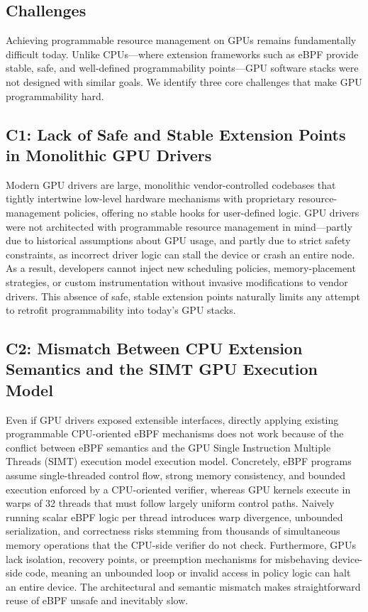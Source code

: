 \subsection{Challenges}
\label{sec:challenges}
Achieving programmable resource management on GPUs remains fundamentally difficult today. 
Unlike CPUs—where extension frameworks such as eBPF provide stable, safe, and well-defined programmability points—GPU software stacks were not designed with similar goals. 
We identify three core challenges that make GPU programmability hard.

\subsection{C1: Lack of Safe and Stable Extension Points in Monolithic GPU Drivers}
Modern GPU drivers are large, monolithic vendor-controlled codebases that tightly intertwine low-level hardware mechanisms with proprietary resource-management policies, offering no stable hooks for user-defined logic. 
GPU drivers were not architected with programmable resource management in mind—partly due to historical assumptions about GPU usage, and partly due to strict safety constraints, as incorrect driver logic can stall the device or crash an entire node. 
As a result, developers cannot inject new scheduling policies, memory-placement strategies, or custom instrumentation without invasive modifications to vendor drivers. This absence of safe, stable extension points naturally limits any attempt to retrofit programmability into today's GPU stacks.

\subsection{C2: Mismatch Between CPU Extension Semantics and the SIMT GPU Execution Model}


Even if GPU drivers exposed extensible interfaces, directly applying existing programmable CPU-oriented eBPF mechanisms does not work because of the conflict between eBPF semantics and the GPU Single Instruction Multiple Threads (SIMT) execution model execution model. 
Concretely, eBPF programs assume single-threaded control flow, strong memory consistency, and bounded execution enforced by a CPU-oriented verifier, whereas GPU kernels execute in warps of 32 threads that must follow largely uniform control paths. 
Naively running scalar eBPF logic per thread introduces warp divergence, unbounded serialization, and correctness risks stemming from thousands of simultaneous memory operations that the CPU-side verifier do not check. 
Furthermore, GPUs lack isolation, recovery points, or preemption mechanisms for misbehaving device-side code, meaning an unbounded loop or invalid access in policy logic can halt an entire device. 
The architectural and semantic mismatch makes straightforward reuse of eBPF unsafe and inevitably slow.


